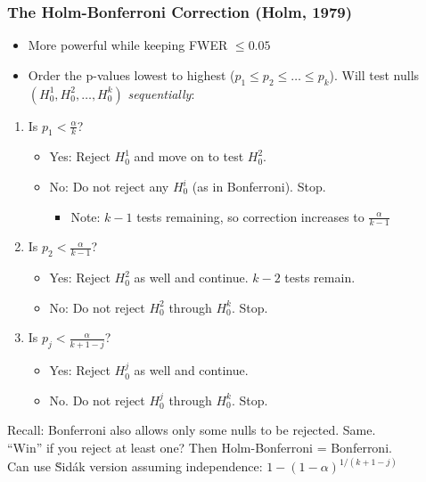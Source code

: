 \begin{frame}
\frametitle{The Holm-Bonferroni Correction (Holm, 1979)}
\begin{itemize}
    \item More powerful while keeping FWER $\leq 0.05$
    \item Order the p-values lowest to highest ($p_1 \leq p_2 \leq \ldots \leq p_{k}$). Will test nulls $(H_0^1,H_0^2,\ldots,H_0^k)$ \textit{sequentially}:
\end{itemize}
\pause
\begin{enumerate}
    \item Is $p_1<\frac{\alpha}{k}$?
    \begin{itemize}
        \item Yes: Reject $H_0^1$ and move on to test $H_0^2$.
        \item No: Do not reject any $H_0^i$ (as in Bonferroni). Stop.
        \begin{itemize}
            \item Note: $k-1$ tests remaining, so correction increases to $\frac{\alpha}{k-1}$
        \end{itemize}
    \end{itemize}
    \item Is $p_2 < \frac{\alpha}{k-1}$?
    \begin{itemize}
        \item Yes: Reject $H_0^2$ as well and continue. $k-2$ tests remain.
        \item No: Do not reject $H_0^2$ through $H_0^k$. Stop.
    \end{itemize}
    \item[j.] Is $p_j < \frac{\alpha}{k+1-j}$?
    \begin{itemize}
        \item Yes: Reject $H_0^j$ as well and continue.
        \item No. Do not reject $H_0^j$ through $H_0^k$. Stop.
    \end{itemize}
\end{enumerate}
Recall: Bonferroni also allows only some nulls to be rejected. Same.\\
``Win'' if you reject at least one? Then Holm-Bonferroni = Bonferroni.\\
Can use \u{S}id\'{a}k version assuming independence: $1-(1-\alpha)^{1/(k+1-j)}$
\end{frame}



